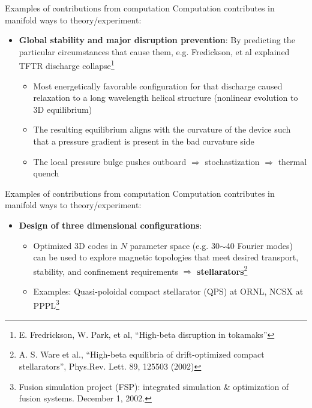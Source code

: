 \documentclass{beamer}
\begin{document}
\begin{frame}{Examples of contributions from computation}
Computation contributes in manifold ways to theory/experiment:
\begin{itemize}
\item \textbf{Global stability and major disruption prevention}: By predicting the particular circumstances that cause them, e.g. Fredickson, et al explained TFTR discharge collapse\footnote{E. Fredrickson, W. Park, et al, “High-beta disruption in tokamaks”} %
\begin{itemize}
\item Most energetically favorable configuration for that discharge caused relaxation to a long wavelength helical structure (nonlinear evolution to 3D equilibrium)
\item The resulting equilibrium aligns with the curvature of the device such that a pressure gradient is present in the bad curvature side
\item The local pressure bulge pushes outboard $\Rightarrow$ stochastization $\Rightarrow$ thermal quench
\end{itemize}
\end{itemize}

\end{frame}


\begin{frame}{Examples of contributions from computation}
Computation contributes in manifold ways to theory/experiment:
\begin{itemize}
\item \textbf{Design of three dimensional configurations}:
\begin{itemize}
\item Optimized 3D codes in $N$ parameter space (e.g. 30$\sim$40 Fourier modes) can be used to explore magnetic topologies that meet desired transport, stability, and confinement requirements $\Rightarrow$ \textbf{stellarators}\footnote{A. S. Ware et al., “High-beta equilibria of drift-optimized compact stellarators”, Phys.Rev. Lett. 89, 125503 (2002)}
\item Examples: Quasi-poloidal compact stellarator (QPS) at ORNL, NCSX at PPPL\footnote{Fusion simulation project (FSP): integrated simulation \& optimization of fusion systems. December 1, 2002.}
\end{itemize}
\end{itemize}


\end{frame}
\end{document}
